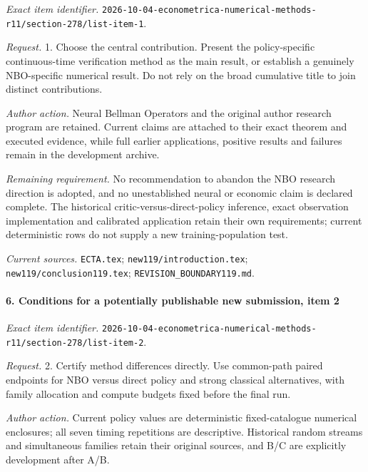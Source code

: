 \emph{Exact item identifier.} \nolinkurl{2026-10-04-econometrica-numerical-methods-r11/section-278/list-item-1}.

\par\emph{Request.} 1. Choose the central contribution. Present the policy-specific continuous-time verification method as the main result, or establish a genuinely NBO-specific numerical result. Do not rely on the broad cumulative title to join distinct contributions.

\par\emph{Author action.} Neural Bellman Operators and the original author research program are retained. Current claims are attached to their exact theorem and executed evidence, while full earlier applications, positive results and failures remain in the development archive.

\par\emph{Remaining requirement.} No recommendation to abandon the NBO research direction is adopted, and no unestablished neural or economic claim is declared complete. The historical critic-versus-direct-policy inference, exact observation implementation and calibrated application retain their own requirements; current deterministic rows do not supply a new training-population test.

\par\emph{Current sources.} \nolinkurl{ECTA.tex}; \nolinkurl{new119/introduction.tex}; \nolinkurl{new119/conclusion119.tex}; \nolinkurl{REVISION_BOUNDARY119.md}.

\paragraph{6. Conditions for a potentially publishable new submission, item 2}

\emph{Exact item identifier.} \nolinkurl{2026-10-04-econometrica-numerical-methods-r11/section-278/list-item-2}.

\par\emph{Request.} 2. Certify method differences directly. Use common-path paired endpoints for NBO versus direct policy and strong classical alternatives, with family allocation and compute budgets fixed before the final run.

\par\emph{Author action.} Current policy values are deterministic fixed-catalogue numerical enclosures; all seven timing repetitions are descriptive. Historical random streams and simultaneous families retain their original sources, and B/\allowbreak{}C are explicitly development after A/\allowbreak{}B.

